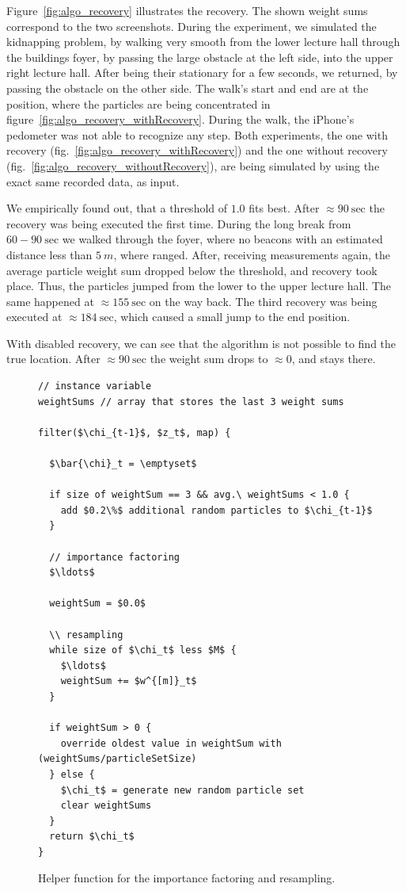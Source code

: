 Figure~\ref{fig:algo_recovery} illustrates the recovery. The shown weight sums correspond to the two screenshots. During the experiment, we simulated the kidnapping problem, by walking very smooth from the lower lecture hall through the buildings foyer, by passing the large obstacle at the left side, into the upper right lecture hall. After being their stationary for a few seconds, we returned, by passing the obstacle on the other side. The walk's start and end are at the position, where the particles are being concentrated in figure~\ref{fig:algo_recovery_withRecovery}. During the walk, the iPhone's pedometer was not able to recognize any step. Both experiments, the one with recovery (fig.~\ref{fig:algo_recovery_withRecovery}) and the one without recovery (fig.~\ref{fig:algo_recovery_withoutRecovery}), are being simulated by using the exact same recorded data, as input.

We empirically found out, that a threshold of $1.0$ fits best. After $\approx 90~\text{sec}$ the recovery was being executed the first time. During the long break from $60 - 90~\text{sec}$ we walked through the foyer, where no beacons with an estimated distance less than $5~m$, where ranged. After, receiving measurements again, the average particle weight sum dropped below the threshold, and recovery took place. Thus, the particles jumped from the lower to the upper lecture hall. The same happened at $\approx 155~\text{sec}$ on the way back. The third recovery was being executed at $\approx 184~\text{sec}$, which caused a small jump to the end position.

With disabled recovery, we can see that the algorithm is not possible to find the true location. After $\approx 90~\text{sec}$ the weight sum drops to $\approx 0$, and stays there.


\begin{figure}
\begin{lstlisting}[mathescape]
// instance variable
weightSums // array that stores the last 3 weight sums

filter($\chi_{t-1}$, $z_t$, map) {
  
  $\bar{\chi}_t = \emptyset$
  
  if size of weightSum == 3 && avg.\ weightSums < 1.0 {
    add $0.2\%$ additional random particles to $\chi_{t-1}$ 
  }

  // importance factoring
  $\ldots$
    
  weightSum = $0.0$
  
  \\ resampling
  while size of $\chi_t$ less $M$ {
    $\ldots$
    weightSum += $w^{[m]}_t$
  }
  
  if weightSum > 0 { 
    override oldest value in weightSum with (weightSums/particleSetSize)
  } else {
    $\chi_t$ = generate new random particle set
    clear weightSums
  }
  return $\chi_t$
}		
\end{lstlisting}
\caption{Helper function for the importance factoring and resampling.}
\label{lst:pf_recovery}
\end{figure}

